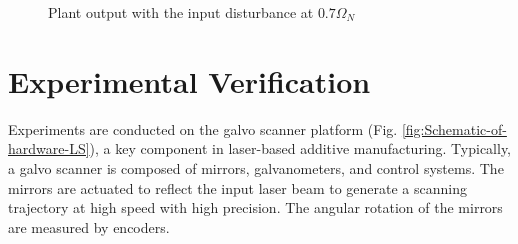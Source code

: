 \documentclass [11pt, proquest] {uwthesis}[2020/02/24]
\begin{document}
\begin{figure}[!ht]
\begin{centering}
\par\end{centering}
\caption{\label{fig:Plant-output-for-1}Plant output with the input disturbance
at $0.7\Omega_{N}$}
\end{figure}

\section{Experimental Verification\label{sec:Experimental-Verification}}

Experiments are conducted on the galvo scanner platform (Fig. \ref{fig:Schematic-of-hardware-LS}),
a key component in laser-based additive manufacturing. Typically,
a galvo scanner is composed of mirrors, galvanometers, and control
systems. The mirrors are actuated to reflect the input laser beam
to generate a scanning trajectory at high speed with high precision.
The angular rotation of the mirrors are measured by encoders. 
\end{document}
